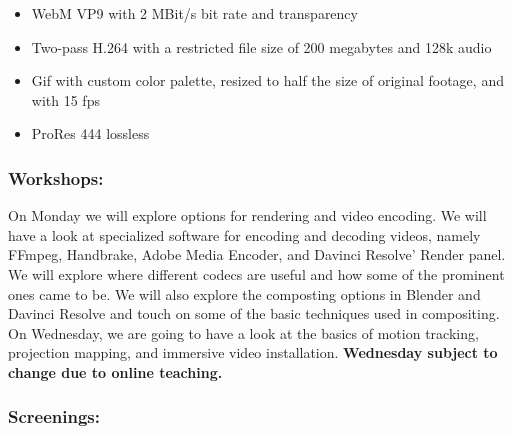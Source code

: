 \documentclass[10pt,letter,english]{article}
\begin{document}
\begin{itemize}
      \item
            WebM VP9 with 2 MBit/s bit rate and transparency
      \item
            Two-pass H.264 with a restricted file size of 200 megabytes and 128k audio
      \item
            Gif with custom color palette, resized to half the size of original
            footage, and with 15 fps
      \item
            ProRes 444 lossless
\end{itemize}

\hypertarget{workshops-2}{%
      \subsubsection*{Workshops:}\label{workshops-2}}

On Monday we will explore options for rendering and video encoding. We will have a look at specialized software for encoding and decoding videos, namely FFmpeg, Handbrake, Adobe Media Encoder, and Davinci Resolve' Render panel. We will explore where different codecs are useful and how some of the prominent ones came to be. We will also explore the composting options in Blender and Davinci Resolve and touch on some of the basic techniques used in compositing. On Wednesday, we are going to have a look at the basics of motion tracking, projection mapping, and immersive video installation. \textbf{Wednesday subject to change due to online teaching.}

\subsubsection*{Screenings:}
\end{document}
